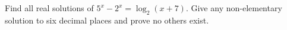 Find all real solutions of $5^x-2^x=\log_2(x+7)$. Give any non-elementary solution to six decimal places and prove no others exist.
